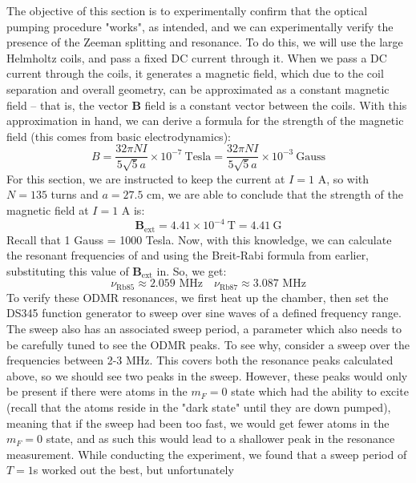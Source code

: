 \documentclass[10pt]{article}
\begin{document}
	The objective of this section is to experimentally confirm that the optical
	pumping procedure "works", as intended, and we can experimentally verify the
	presence of the Zeeman splitting and resonance. To do this, we will use the large
	Helmholtz coils, and pass a fixed DC current through it. When we pass a DC
	current through the coils, it generates a magnetic field, which due to the coil
	separation and overall geometry, can be approximated as a constant magnetic field
	-- that is, the vector \( \mathbf{B} \) field is a constant vector between the
	coils. With this approximation in hand, we can derive a formula for the strength
	of the magnetic field (this comes from basic electrodynamics):
	\begin{equation}\label{helmholtz}
		B = \frac{32 \pi N I}{5\sqrt{5}a} \times 10^{-7}\ \text{Tesla}
		= \frac{32 \pi N I}{5\sqrt{5}a} \times 10^{-3}\ \text{Gauss}
	\end{equation}
	For this section, we are instructed to keep the current at \( I = 1 \) A, so with
	\( N = 135 \) turns and \( a = 27.5 \) cm, we are able to conclude that the
	strength of the magnetic field at \( I = 1 \) A is:
	\[
		\mathbf{B}_\text{ext} = 4.41 \times 10^{-4} \ \text{T} = 4.41 \ \text{G}
	\]
	Recall that 1 Gauss = 1000 Tesla. Now, with this knowledge, we can calculate the
	resonant frequencies of  and  using the Breit-Rabi
	formula from earlier, substituting this value of \( \mathbf{B}_\text{ext} \) in.
	So, we get:
	\[
		\nu_{\text{Rb85}} \approx 2.059 \text{ MHz} \quad \nu_{\text{Rb87}} \approx
			3.087 \text{ MHz}
	\]
	To verify these ODMR resonances, we first heat up the chamber, then set the DS345
	function generator to sweep over sine waves of a defined frequency range. The
	sweep also has an associated sweep period, a parameter which also needs to be
	carefully tuned to see the ODMR peaks. To see why, consider a sweep over the
	frequencies between 2-3 MHz. This covers both the resonance peaks calculated
	above, so we should see two peaks in the sweep. However, these peaks would only
	be present if there were atoms in the \( m_F = 0 \) state which had the ability
	to excite (recall that the atoms reside in the "dark state" until they are
	down pumped), meaning that if the sweep had been too fast, we would get fewer
	atoms in the \( m_F = 0 \) state, and as such this would lead to a shallower peak
	in the resonance measurement. While conducting the experiment, 
	we found that a sweep period of \( T = 1\)s worked out the best, but unfortunately 
\end{document}
